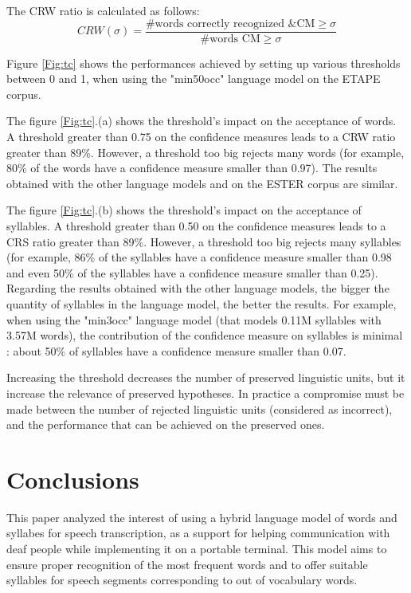 \documentclass[a4paper]{article}
\begin{document}
The CRW ratio is calculated as follows:
	$$CRW(\sigma)=\frac{\text{\# words correctly recognized \& CM} \ge \sigma}{\text{\# words CM} \ge \sigma}$$

Figure \ref{Fig:tc} shows the performances achieved by setting up various thresholds between 0 and 1, when using the "min50occ" language model on the ETAPE corpus.

The figure \ref{Fig:tc}.(a) shows the threshold's impact on the acceptance of words. A threshold greater than 0.75 on the confidence measures leads to a CRW ratio greater than 89\%. However, a threshold too big rejects many words (for example, 80\% of the words have a confidence measure smaller than 0.97). The results obtained with the other language models and on the ESTER corpus are similar.

The figure \ref{Fig:tc}.(b) shows the threshold's impact on the acceptance of syllables. A threshold greater than 0.50 on the confidence measures leads to a CRS ratio greater than 89\%. However, a threshold too big rejects many syllables (for example, 86\% of the syllables have a confidence measure smaller than 0.98 and even 50\% of the syllables have a confidence measure smaller than 0.25). Regarding the results obtained with the other language models, the bigger the quantity of syllables in the language model, the better the results. For example, when using the "min3occ" language model (that models 0.11M syllables with 3.57M words), the contribution of the confidence measure on syllables is minimal : about 50\% of syllables have a confidence measure smaller than 0.07.

Increasing the threshold decreases the number of preserved linguistic units, but it increase the relevance of preserved hypotheses.
In practice a compromise must be made between the number of rejected linguistic units (considered as incorrect), and the performance that can be achieved on the preserved ones.



\section{Conclusions}

This paper analyzed the interest of using a hybrid language model of words and syllabes for speech transcription, as a support for helping communication with deaf people while implementing it on a portable terminal. This model aims to ensure proper recognition of the most frequent words and to offer suitable syllables for speech segments corresponding to out of vocabulary words.
\end{document}
